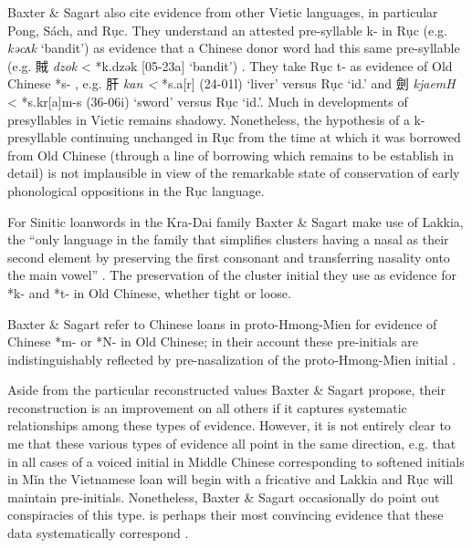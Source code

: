 Baxter \& Sagart also cite evidence from other Vietic languages, in
particular Pong, Sách, and Rục. They understand an attested pre-syllable
k- in Rục (e.g. \emph{kəcʌk} `bandit') as evidence that a Chinese donor
word had this same pre-syllable (e.g. 賊  \emph{dzok} \textless{}
*k.dz{}ək {[}05-23a] `bandit')
\citeyearpar[47-48]{Baxter2014OldChinese}.
They take Rục t- as
evidence of Old Chinese *s- 
\citeyearpar[136-137]{Baxter2014OldChinese},
e.g. 肝  \emph{kan
\textless{} }*s.{}a{[}r] (24-01l) `liver' versus Rục \emph{}
`id.' and 劍 \emph{kjaemH} \textless{} *s.kr{[}a]m-s (36-06i) `sword'
versus Rục \emph{} `id.'. Much in developments of presyllables in
Vietic remains shadowy. Nonetheless, the hypothesis of a k- presyllable
continuing unchanged in Rục from the time at which it was borrowed from
Old Chinese (through a line of borrowing which remains to be establish
in detail) is not implausible in view of the remarkable state of
conservation of early phonological oppositions in the Rục language.

For Sinitic loanwords in the Kra-Dai family Baxter \& Sagart make use of
Lakkia, the ``only language in the family that simplifies clusters
having a nasal as their second element by preserving the first consonant
and transferring nasality onto the main vowel'' 
\citeyearpar[36]{Baxter2014OldChinese}. 
The preservation of the cluster initial they use as evidence for *k- and *t-
in Old Chinese, whether tight or loose.

Baxter \& Sagart refer to Chinese loans in proto-Hmong-Mien for evidence
of Chinese *m- or *N- in Old Chinese; in their account these
pre-initials are indistinguishably reflected by pre-nasalization of the
proto-Hmong-Mien initial 
\citeyearpar[48]{Baxter2014OldChinese}.

Aside from the particular reconstructed values Baxter \& Sagart propose,
their reconstruction is an improvement on all others if it captures
systematic relationships among these types of evidence. However, it is
not entirely clear to me that these various types of evidence all point
in the same direction, e.g. that in all cases of a voiced initial in
Middle Chinese corresponding to softened initials in Mǐn the Vietnamese
loan will begin with a fricative and Lakkia and Rục will maintain
pre-initials. Nonetheless, Baxter \& Sagart occasionally do point out
conspiracies of this type. is perhaps their most convincing evidence
that these data systematically correspond 
\citep[37]{Baxter2014OldChinese}.

